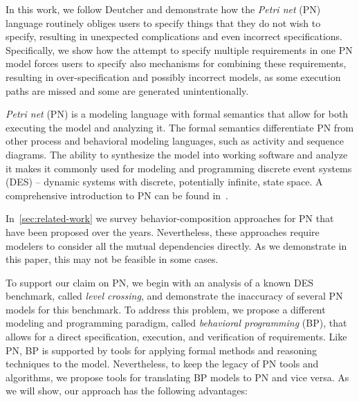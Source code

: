 \documentclass[10pt,journal,compsoc]{IEEEtran}
\theoremstyle{definition}
\begin{document}
In this work, we follow Deutcher and demonstrate how the \emph{Petri net} (PN) language routinely obliges users to specify things that they do not wish to specify, resulting in unexpected complications and even incorrect specifications. Specifically, we show how the attempt to specify multiple requirements in one PN model forces users to specify also mechanisms for combining these requirements, resulting in over-specification and possibly incorrect models, as some execution paths are missed and some are generated unintentionally.

\textit{Petri net} (PN) is a modeling language with formal semantics that allow for both executing the model and analyzing it. The formal semantics differentiate PN from other process and behavioral modeling languages, such as activity and sequence diagrams. The ability to synthesize the model into working software and analyze it makes it commonly used for modeling and programming discrete event systems (DES) -- dynamic systems with discrete, potentially infinite, state space. A comprehensive introduction to PN can be found in~\cite{reisig2012petri}. 

In~\autoref{sec:related-work} we survey behavior-composition approaches for PN that have been proposed over the years. Nevertheless, these approaches require modelers to consider all the mutual dependencies directly. As we demonstrate in this paper, this may not be feasible in some cases.

To support our claim on PN, we begin with an analysis of a known DES benchmark, called \textit{level crossing}, and demonstrate the inaccuracy of several PN models for this benchmark. To address this problem, we propose a different modeling and programming paradigm, called \textit{behavioral programming} (BP), that allows for a direct specification, execution, and verification of requirements. Like PN, BP is supported by tools for applying formal methods and reasoning techniques to the model. Nevertheless, to keep the legacy of PN tools and algorithms, we propose tools for translating BP models to PN and vice versa. As we will show, our approach has the following advantages:
\end{document}
